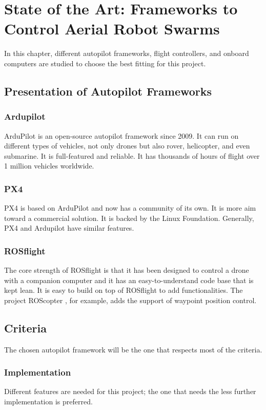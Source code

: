 \chapter{State of the Art: Frameworks to Control Aerial Robot Swarms}

In this chapter, different autopilot frameworks, flight controllers, and onboard computers are studied to choose the best fitting for this project.

\section{Presentation of Autopilot Frameworks}
    \subsection{Ardupilot}
    ArduPilot is an open-source autopilot framework since 2009.
    It can run on different types of vehicles, not only drones but also rover, helicopter, and even submarine.
    It is full-featured and reliable. It has thousands of hours of flight over 1 million vehicles worldwide.

    \subsection{PX4}
    PX4 is based on ArduPilot and now has a community of its own. It is more aim toward a commercial solution.
    It is backed by the Linux Foundation.
    Generally, PX4 and Ardupilot have similar features.

    \subsection{ROSflight}
    The core strength of ROSflight is that it has been designed to control a drone with a companion computer
    and it has an easy-to-understand code base that is kept lean.
    It is easy to build on top of ROSflight to add functionalities. The project ROScopter \cite{github_roscopter}, for example, adds the support of waypoint position control.

\section{Criteria}
The chosen autopilot framework will be the one that respects most of the criteria.

    \subsection{Implementation}
    Different features are needed for this project; the one that needs the less further implementation is preferred.

